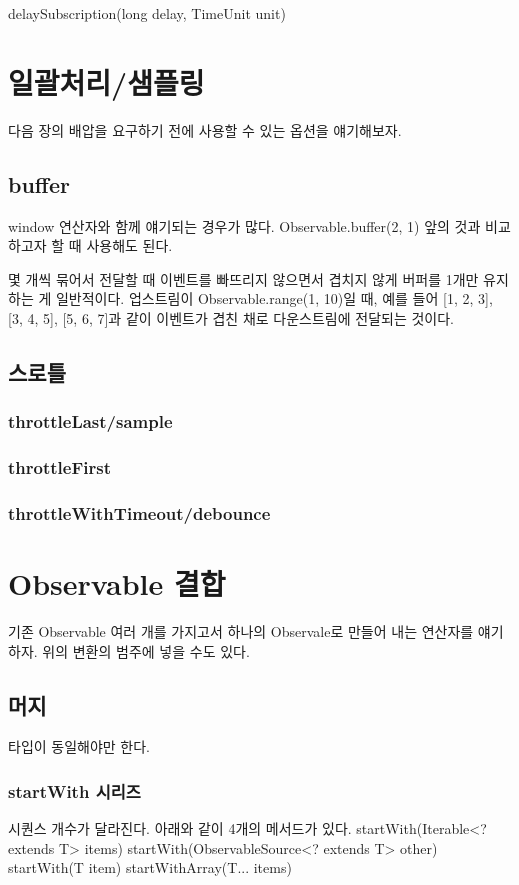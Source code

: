 \documentclass{book}
\begin{document}
{delaySubscription(long delay, TimeUnit unit)


           
\section{일괄처리/샘플링}
다음 장의 배압을 요구하기 전에 사용할 수 있는 옵션을 얘기해보자.

\subsection{buffer}
window 연산자와 함께 얘기되는 경우가 많다.
Observable.buffer(2, 1)
앞의 것과 비교하고자 할 때 사용해도  된다.

몇 개씩 묶어서 전달할 때 이벤트를 빠뜨리지 않으면서 겹치지 않게 버퍼를 1개만 유지하는 게 일반적이다. 
 업스트림이 Observable.range(1, 10)일 때, 예를 들어  [1, 2, 3], [3, 4, 5], [5, 6, 7]과 같이 이벤트가 겹친 채로 다운스트림에 전달되는 것이다. 

\subsection{스로틀}
\subsubsection{throttleLast/sample}

\subsubsection{throttleFirst}

\subsubsection{throttleWithTimeout/debounce}

\section{Observable 결합}
기존 Observable 여러 개를 가지고서 하나의 Observale로 만들어 내는 연산자를 얘기하자.
위의 변환의 범주에 넣을 수도 있다.

\subsection{머지}
타입이 동일해야만 한다.
\subsubsection{startWith 시리즈}
시퀀스 개수가 달라진다. 아래와 같이 4개의 메서드가 있다. 
startWith(Iterable<? extends T> items)
startWith(ObservableSource<? extends T> other)
startWith(T item)
startWithArray(T... items) 

}
\end{document}
